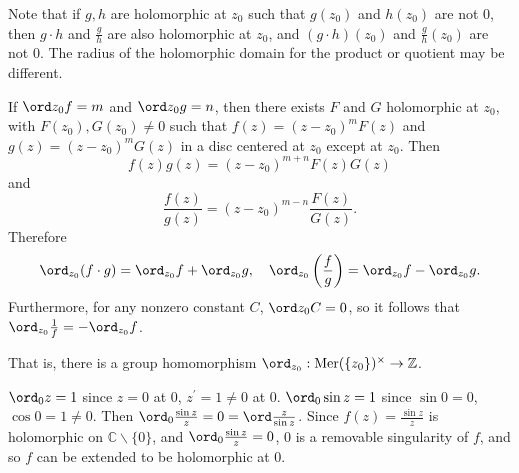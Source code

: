 
Note that if $g, h$ are holomorphic at $z_0$ such that
$g(z_0)$ and $h(z_0)$ are not 0, then $g \cdot h$ and
$\frac{g}{h}$ are also holomorphic at $z_0$, and
$(g \cdot h)(z_0)$ and $\frac{g}{h}(z_0)$ are not 0.
The radius of the holomorphic domain for the product or quotient
may be different.

If $\ord z_0 f = m$ and $\ord z_0 g = n$, then there exists
$F$ and $G$ holomorphic at $z_0$, with $F(z_0), G(z_0) \neq 0$
such that
$f(z) = (z - z_0)^m F(z)$ and $g(z) = (z - z_0)^m G(z)$
in a disc centered at $z_0$ except at $z_0$. Then
$$
f(z) g(z) = (z - z_0)^{m + n} F(z) G(z)
$$
and
$$
\frac{f(z)}{g(z)} = (z - z_0)^{m - n} \frac{F(z)}{G(z)}.
$$
Therefore
$$
  \ord_{z_0} (f \cdot g)
= \ord_{z_0} f + \ord_{z_0} g, \quad
  \ord_{z_0} \left(\frac{f}{g}\right)
= \ord_{z_0} f - \ord_{z_0} g.
$$
Furthermore, for any nonzero constant $C$,
$\ord z_0 C = 0$, so it follows that
$\ord_{z_0} \frac{1}{f} = -\ord_{z_0} f$.

That is, there is a group homomorphism
$\mathrm{\ord}_{z_0} : \mathrm{Mer}(\{z_0\})^\times \to \mathbb{Z}$.

\begin{xmpl}
$\ord_0 z = 1$ since $z = 0$ at 0, $z^\prime = 1 \neq 0$ at 0.
$\ord_0 \sin z = 1$ since $\sin 0 = 0$, $\cos 0 = 1 \neq 0$.
Then $\ord_0 \frac{\sin z}{z} = 0 = \ord \frac{z}{\sin z}$.
Since $f(z) = \frac{\sin z}{z}$ is holomorphic on
$\mathbb{C} \backslash \{ 0 \}$, and
$\ord_0 \frac{\sin z}{z} = 0$, 0 is a removable singularity of
$f$, and so $f$ can be extended to be holomorphic at 0.
\end{xmpl}

